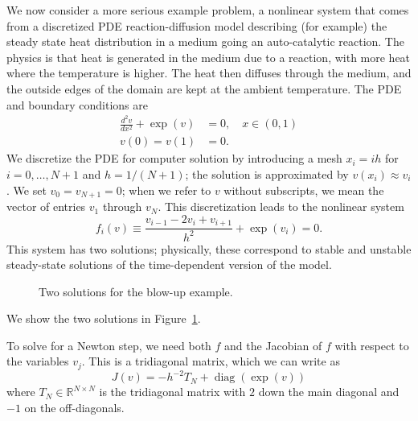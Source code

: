 \documentclass[12pt, leqno]{article} %
\begin{document}
We now consider a more serious example problem, a nonlinear system that
comes from a discretized PDE reaction-diffusion model describing (for
example) the steady state heat distribution in a medium going an
auto-catalytic reaction. The physics is that heat is generated in the
medium due to a reaction, with more heat where the temperature is
higher. The heat then diffuses through the medium, and the outside edges
of the domain are kept at the ambient temperature. The PDE and boundary
conditions are \begin{align*}
\frac{d^2 v}{dx^2} + \exp(v) &= 0, \quad x \in (0,1) \\
v(0) = v(1) &= 0.
\end{align*} We discretize the PDE for computer solution by introducing
a mesh \(x_i = ih\) for \(i = 0, \ldots, N+1\) and \(h = 1/(N+1)\); the
solution is approximated by \(v(x_i) \approx v_i\). We set
\(v_0 = v_{N+1} = 0\); when we refer to \(v\) without subscripts, we
mean the vector of entries \(v_1\) through \(v_N\). This discretization
leads to the nonlinear system
\[f_i(v) \equiv \frac{v_{i-1} - 2v_i + v_{i+1}}{h^2} + \exp(v_i) = 0.\]
This system has two solutions; physically, these correspond to stable
and unstable steady-state solutions of the time-dependent version of the
model.

\begin{figure}
\hspace{0.08\textwidth}
\caption{Two solutions for the blow-up example.}
\label{fig:soln}
\end{figure}

We show the two solutions in Figure~\ref{fig:soln}.

To solve for a Newton step, we need both \(f\) and the Jacobian of \(f\)
with respect to the variables \(v_j\). This is a tridiagonal matrix,
which we can write as
\[J(v) = -h^{-2} T_N + \operatorname{diag}(\exp(v))\] where
\(T_N \in \mathbb{R}^{N \times N}\) is the tridiagonal matrix with \(2\)
down the main diagonal and \(-1\) on the off-diagonals.
\end{document}
